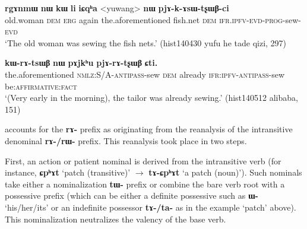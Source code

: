 \documentclass[oneside,a4paper,11pt]{article}
\newcommand{\ipa}[1]{{\phon\textbf{#1}}}
\begin{document}

\begin{exe}
\ex \label{ex:pjAkAsWtsxWBci}
\gll 
\ipa{rgɤnmɯ}	\ipa{nɯ}	\ipa{kɯ}	\ipa{li}	\ipa{iɕqʰa}	<yuwang>	\ipa{nɯ}	\ipa{pjɤ-k-ɤsɯ-tʂɯβ-ci} \\
old.woman \textsc{dem} \textsc{erg} again the.aforementioned fish.net \textsc{dem} \textsc{ifr.ipfv-evd-prog}-sew-\textsc{evd} \\
\glt `The old woman was sewing the fish nets.' (hist140430 yufu he tade qizi, 297)
\end{exe}

\begin{exe}
\ex \label{ex:pjArAtsxWB}
\gll \ipa{iɕqʰa}	\ipa{kɯ-rɤ-tsɯβ}	\ipa{nɯ}	\ipa{pɤjkʰu}	\ipa{pjɤ-rɤ-tʂɯβ}	\ipa{ɕti.} \\
the.aforementioned \textsc{nmlz:S/A-antipass}-sew  \textsc{dem} already  \textsc{ifr:ipfv-antipass}-sew be:\textsc{affirmative:fact} \\
\glt `(Very early in the morning), the tailor was already sewing.' (hist140512 alibaba, 151)
\end{exe}

\citet{jacques14antipassive} accounts for the \ipa{rɤ-} prefix as originating from the reanalysis of the intransitive denominal \ipa{rɤ-/rɯ-} prefix. This reanalysis took place in two steps. 

First, an action or patient nominal is derived from the intransitive verb (for instance, \ipa{ɕpʰɤt} `patch (transitive)' $\rightarrow$  \ipa{tɤ-ɕpʰɤt} `a patch (noun)'). Such nominals take either a nominalization \ipa{tɯ-} prefix or combine the bare verb root with a possessive prefix (which can be either a definite possessive such as \ipa{ɯ-} `his/her/its' or an indefinite possessor \ipa{tɤ-/ta-} as in the example `patch' above). This nominalization neutralizes the valency of the base verb.
\end{document}
